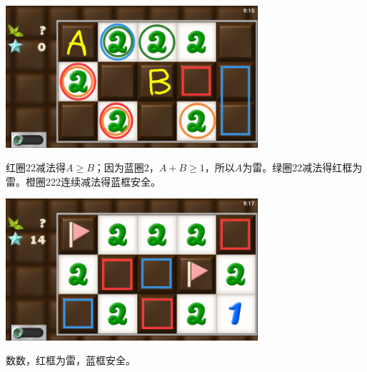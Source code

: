 \subsection{} %
\begin{center}
    \includegraphics[width=0.7\textwidth]{puzzle/119-1.png}
\end{center}
红圈22减法得$A\ge B$；因为蓝圈2，$A+B\ge 1$，所以$A$为雷。绿圈22减法得红框为雷。橙圈222连续减法得蓝框安全。
\begin{center}
    \includegraphics[width=0.7\textwidth]{puzzle/119-2.png}
\end{center}
数数，红框为雷，蓝框安全。


